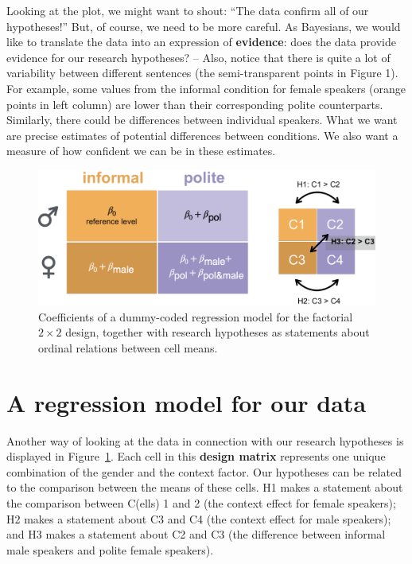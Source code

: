 \documentclass[nobib]{tufte-handout}
\newcommand{\tr}[1]{\textcolor{DarkOrange}{[tr: #1]}}
\begin{document}
Looking at the plot, we might want to shout: ``The data confirm all of our hypotheses!'' But,
of course, we need to be more careful. As Bayesians, we would like to translate the data into
an expression of \textbf{evidence}: does the data provide evidence for our research hypotheses?
-- Also, notice that there is quite a lot of variability between different sentences (the
semi-transparent points in Figure 1). For example, some values from the informal condition for
female speakers (orange points in left column) are lower than their corresponding polite
counterparts. Similarly, there could be differences between individual speakers. What we want
are precise estimates of potential differences between conditions. We also want a measure of
how confident we can be in these estimates.

\begin{figure}[h]
  \centering
    \includegraphics[width = \textwidth]{pics/table_mean_hypotheses_cropped.png}
    \caption{Coefficients of a dummy-coded regression model for the factorial $2 \times 2$ design, together with research hypotheses as statements about ordinal relations between cell means.}
    \label{fig:BasicPlotData_table}
\end{figure}

\section{A regression model for our data}

Another way of looking at the data in connection with our research hypotheses is displayed in
Figure~\ref{fig:BasicPlotData_table}. Each cell in this \textbf{design matrix} represents one
unique combination of the gender and the context factor.
%
%
Our hypotheses can be related to the comparison between the means of these cells.
H1 makes a statement about the comparison between C(ells) 1 and 2 (the context effect for female speakers); H2 makes a statement about C3 and C4 (the context effect for male speakers); and H3 makes a statement about C2 and C3 (the difference between informal male speakers and polite female speakers).
\end{document}

